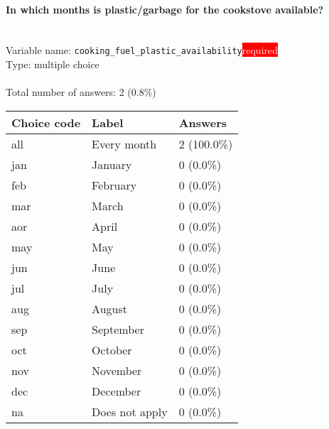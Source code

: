 \documentclass[11.5pt, a4paper]{scrartcl}
\begin{document}
\paragraph{In which months is plastic/garbage for the cookstove available?}
\  \\Variable name: \texttt{cooking\_fuel\_plastic\_availability}\hfill\colorbox{red}{\small{\textcolor{white}{required}}}\\
 Type: multiple choice\\
\\Total number of answers: 2 (0.8\%)
\\[0.2em] \begin{tabular}{p{4cm}|p{8cm}|p{3cm}}
Choice code & Label & Answers \\
\hline
all & Every month& \cellcolor{color4}2 (100.0\%)\\
\cellcolor{mygray} jan & \cellcolor{mygray}January & \cellcolor{color0}0 (0.0\%)\\
feb & February& \cellcolor{color0}0 (0.0\%)\\
\cellcolor{mygray} mar & \cellcolor{mygray}March & \cellcolor{color0}0 (0.0\%)\\
aor & April& \cellcolor{color0}0 (0.0\%)\\
\cellcolor{mygray} may & \cellcolor{mygray}May & \cellcolor{color0}0 (0.0\%)\\
jun & June& \cellcolor{color0}0 (0.0\%)\\
\cellcolor{mygray} jul & \cellcolor{mygray}July & \cellcolor{color0}0 (0.0\%)\\
aug & August& \cellcolor{color0}0 (0.0\%)\\
\cellcolor{mygray} sep  & \cellcolor{mygray}September & \cellcolor{color0}0 (0.0\%)\\
oct  & October& \cellcolor{color0}0 (0.0\%)\\
\cellcolor{mygray} nov & \cellcolor{mygray}November & \cellcolor{color0}0 (0.0\%)\\
dec  & December& \cellcolor{color0}0 (0.0\%)\\
\cellcolor{mygray} na & \cellcolor{mygray}Does not apply & \cellcolor{color0}0 (0.0\%)\\
\end{tabular}
\end{document}
